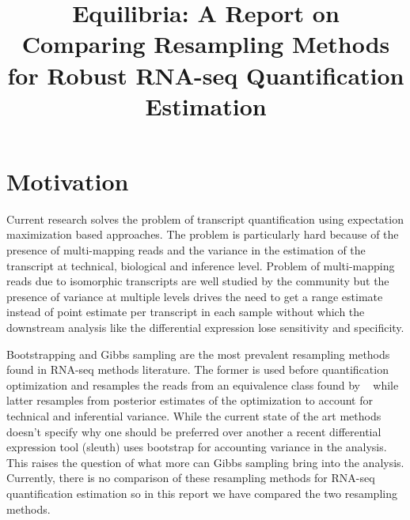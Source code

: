 \documentclass{article}
\begin{document}
\title{{Equilibria: A Report on Comparing Resampling Methods for Robust RNA-seq Quantification Estimation}\\ \bigskip}

\date{}

\maketitle
{}
\setcounter{section}{0}

\section{Motivation}
Current research solves the problem of transcript quantification using expectation maximization based approaches.
The problem is particularly hard because of the presence of multi-mapping reads and the variance in the estimation 
of the transcript at technical, biological and inference level. Problem of multi-mapping reads due to isomorphic transcripts
are well studied by the community but the presence of variance at multiple levels drives the need to get a range estimate 
instead of point estimate per transcript in each sample without which the downstream analysis like the differential expression 
lose sensitivity and specificity.

Bootstrapping and Gibbs sampling are the most prevalent resampling methods found in RNA-seq methods literature. The former is used
before quantification optimization and resamples the reads from an equivalence class found by ~\citep{Patro2016Salmon} while latter resamples from
posterior estimates of the optimization to account for technical and inferential variance. While the current state of the art methods doesn't
specify why one should be preferred over another a recent differential expression tool (sleuth) uses bootstrap for accounting
variance in the analysis. This raises the question of what more can Gibbs sampling bring into the analysis. Currently, there is no
comparison of these resampling methods for RNA-seq quantification estimation so in this report we have compared the two resampling methods.
\end{document}
